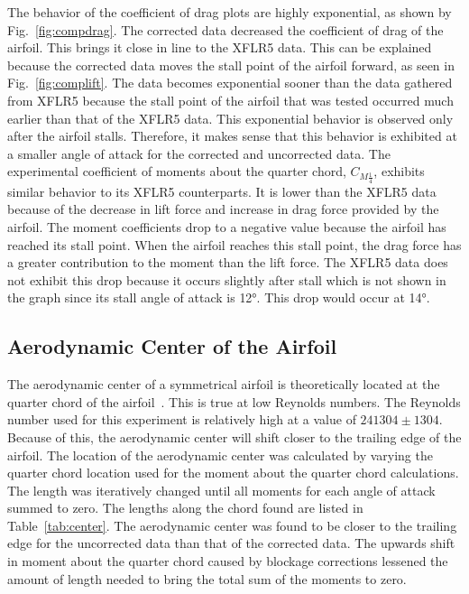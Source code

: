 \documentclass[journal,letterpaper]{IEEEtran}
\begin{document}
The behavior of the coefficient of drag plots are highly exponential, as shown by Fig.~\ref{fig:compdrag}.
The corrected data decreased the coefficient of drag of the airfoil.
This brings it close in line to the XFLR5 data.
This can be explained because the corrected data moves the stall point of the airfoil forward, as seen in Fig.~\ref{fig:complift}.
The data becomes exponential sooner than the data gathered from XFLR5 because the stall point of the airfoil that was tested occurred much earlier than that of the XFLR5 data.
This exponential behavior is observed only after the airfoil stalls.
Therefore, it makes sense that this behavior is exhibited at a smaller angle of attack for the corrected and uncorrected data.
The experimental coefficient of moments about the quarter chord, $C_{M\frac{1}{4}}$, exhibits similar behavior to its XFLR5 counterparts.
It is lower than the XFLR5 data because of the decrease in lift force and increase in drag force provided by the airfoil.
The moment coefficients drop to a negative value because the airfoil has reached its stall point.
When the airfoil reaches this stall point, the drag force has a greater contribution to the moment than the lift force.
The XFLR5 data does not exhibit this drop because it occurs slightly after stall which is not shown in the graph since its stall angle of attack is \ang{12}.
This drop would occur at \ang{14}.

\subsection{Aerodynamic Center of the Airfoil}

The aerodynamic center of a symmetrical airfoil is theoretically located at the quarter chord of the airfoil~\cite{Symmetrical}.
This is true at low Reynolds numbers.
The Reynolds number used for this experiment is relatively high at a value of $241304 \pm 1304$.
Because of this, the aerodynamic center will shift closer to the trailing edge of the airfoil.
The location of the aerodynamic center was calculated by varying the quarter chord location used for the moment about the quarter chord calculations.
The length was iteratively changed until all moments for each angle of attack summed to zero.
The lengths along the chord found are listed in Table~\ref{tab:center}.
The aerodynamic center was found to be closer to the trailing edge for the uncorrected data than that of the corrected data.
The upwards shift in moment about the quarter chord caused by blockage corrections lessened the amount of length needed to bring the total sum of the moments to zero.
\end{document}
